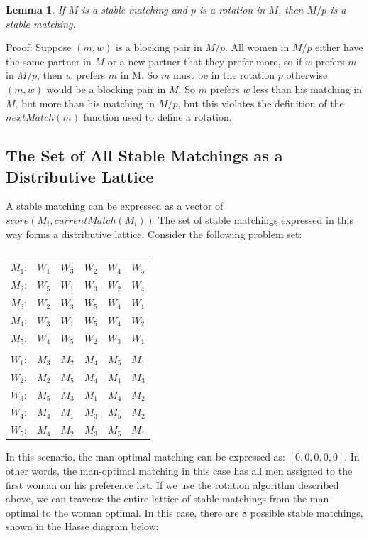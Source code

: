\documentclass[a4paper]{article}
\newtheorem{lemma}[theorem]{Lemma}
\begin{document}
\begin{lemma}
If $M$ is a stable matching and $p$ is a rotation in $M$, then $M / p$ is a stable matching.
\end{lemma}
Proof: Suppose $(m, w)$ is a blocking pair in $M / p$. All women in $M / p$ either have the same partner in $M$ or a new partner that they prefer more, so if $w$ prefers $m$ in $M / p$, then $w$ prefers $m$ in M. So $m$ must be in the rotation $p$ otherwise $(m, w)$ would be a blocking pair in $M$. So $m$ prefers $w$ less than his matching in $M$, but more than his matching in $M / p$, but this violates the definition of the $nextMatch(m)$ function used to define a rotation.

\subsection{The Set of All Stable Matchings as a Distributive Lattice}

A stable matching can be expressed as a vector of $score(M_i, currentMatch(M_i))$
The set of stable matchings expressed in this way forms a distributive lattice. Consider the following problem set:

\begin{table}[H]
\caption{}
\begin{tabular}{llllll}
$M_1$: & $W_1$ & $W_3$ & $W_2$ & $W_4$ & $W_5$ \\
$M_2$: & $W_5$ & $W_1$ & $W_3$ & $W_2$ & $W_4$ \\
$M_3$: & $W_2$ & $W_3$ & $W_5$ & $W_4$ & $W_1$ \\
$M_4$: & $W_3$ & $W_1$ & $W_5$ & $W_4$ & $W_2$ \\
$M_5$: & $W_4$ & $W_5$ & $W_2$ & $W_3$ & $W_1$ \\
\\
$W_1$: & $M_3$ & $M_2$ & $M_4$ & $M_5$ & $M_1$ \\
$W_2$: & $M_2$ & $M_5$ & $M_4$ & $M_1$ & $M_3$ \\
$W_3$: & $M_5$ & $M_3$ & $M_1$ & $M_4$ & $M_2$ \\
$W_4$: & $M_4$ & $M_1$ & $M_3$ & $M_5$ & $M_2$ \\
$W_5$: & $M_4$ & $M_2$ & $M_3$ & $M_5$ & $M_1$ \\
\end{tabular}
\centering
\end{table}

In this scenario, the man-optimal matching can be expressed as: $[0,0,0,0,0]$. In other words, the man-optimal matching in this case has all men assigned to the first woman on his preference list. If we use the rotation algorithm described above, we can traverse the entire lattice of stable matchings from the man-optimal to the woman optimal. In this case, there are 8 possible stable matchings, shown in the Hasse diagram below:
\end{document}
